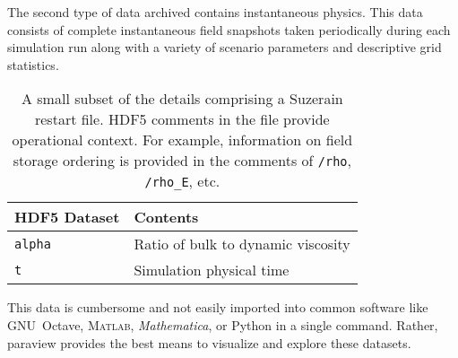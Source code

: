 The second type of data archived contains instantaneous physics.  This data
consists of complete instantaneous field snapshots taken periodically during each
simulation run along with a variety of scenario parameters and descriptive grid
statistics.  

\begin{table}
\centering
\caption[Instantaneous fields and other details comprising a restart file]{%
  A small subset of the details comprising a Suzerain restart file.
  HDF5 comments in the file provide operational context.  For example,
  information on field storage ordering is provided in the comments of
  \texttt{/rho}, \texttt{/rho\_E}, etc.\label{tbl:restartfile}
}
\begin{small}
\begin{tabular}{p{}|p{}}
HDF5 Dataset & Contents \\ \hline \hline
\texttt{alpha                 } & Ratio of bulk to dynamic viscosity \\
\texttt{t                     } & Simulation physical time \\
\end{tabular}
\end{small}
\end{table}

This data is cumbersome and not easily imported into common software like GNU~Octave,
\textsc{Matlab}\textsuperscript{\textregistered}, \textit{Mathematica}\textsuperscript{\textregistered}, or
Python in a single command. Rather, paraview provides the best means to visualize and explore these 
datasets. 
